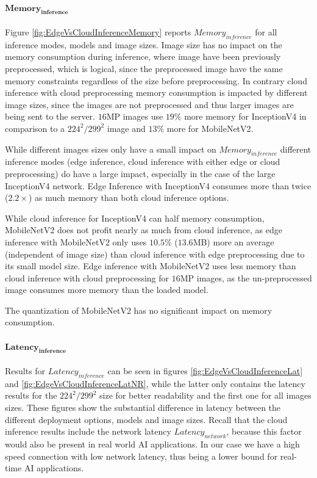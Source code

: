 \paragraph{$\mathbf{Memory_{inference}}$}
Figure \ref{fig:EdgeVsCloudInferenceMemory} reports $Memory_{inference}$ for all inference modes, models and image sizes.
Image size has no impact on the memory consumption during inference, where image have been previously preprocessed, which is logical, since the preprocessed image have the same memory constraints regardless of the size before preprocessing.
In contrary cloud inference with cloud preprocessing memory consumption is impacted by different image sizes, since the images are not preprocessed and thus larger images are being sent to the server.
$16$MP images use $19\%$ more memory for InceptionV4 in comparison to a $224^2/299^2$ image and $13\%$ more for MobileNetV2.


While different images sizes only have a small impact on $Memory_{inference}$ different inference modes (edge inference, cloud inference with either edge or cloud preprocessing) do have a large impact, especially in the case of the large InceptionV4 network.
Edge Inference with InceptionV4 consumes more than twice ($2.2\times$) as much memory than both cloud inference options.

While cloud inference for InceptionV4 can half memory consumption, MobileNetV2 does not profit nearly as much from cloud inference, as edge inference with MobileNetV2 only uses $10.5\%$ ($13.6$MB) more an average (independent of image size) than cloud inference with edge preprocessing due to its small model size.
Edge inference with MobileNetV2 uses less memory than cloud inference with cloud preprocessing for $16$MP images, as the un-preprocessed image consumes more memory than the loaded model. 

The quantization of MobileNetV2 has no significant impact on memory consumption.


\paragraph{$\mathbf{Latency_{inference}}$}
Results for $Latency_{inference}$ can be seen in figures \ref{fig:EdgeVsCloudInferenceLat} and \ref{fig:EdgeVsCloudInferenceLatNR}, while the latter only contains the latency results for the $224^2/299^2$ size for better readability and the first one for all images sizes.
These figures show the substantial difference in latency between the different deployment options, models and image sizes.
Recall that the cloud inference results include the network latency $Latency_{network}$, because this factor would also be present in real world AI applications.  In our case we have a high speed connection with low network latency, thus being a lower bound for real-time AI applications.

